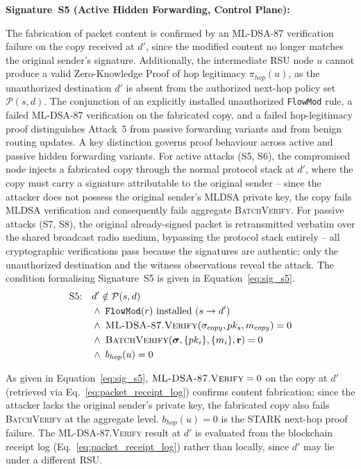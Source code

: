 \documentclass[12pt, a4paper]{report}
\begin{document}
\textbf{Signature~S5 (Active Hidden Forwarding, Control Plane):}

The fabrication of packet content is confirmed by an ML-DSA-87 verification
failure on the copy received at $d'$, since the modified content no longer
matches the original sender's signature.
Additionally, the intermediate RSU node $u$ cannot produce a valid
Zero-Knowledge Proof of hop legitimacy $\pi_{hop}(u)$, as the unauthorized
destination $d'$ is absent from the authorized next-hop policy set
$\mathcal{P}(s,d)$.
The conjunction of an explicitly installed unauthorized \texttt{FlowMod}
rule, a failed ML-DSA-87 verification on the fabricated copy, and a failed
hop-legitimacy proof distinguishes Attack~5 from passive forwarding variants and from benign routing updates. A key distinction governs proof behaviour across active
and passive hidden forwarding variants. For active attacks
(S5, S6), the compromised node injects a fabricated copy
through the normal protocol stack at $d'$, where the
copy must carry a signature attributable to the original
sender -- since the attacker does not possess the
original sender's \ac{MLDSA} private key, the copy
fails \ac{MLDSA} verification and consequently fails
aggregate \textsc{BatchVerify}. For passive attacks
(S7, S8), the original already-signed packet is
retransmitted verbatim over the shared broadcast radio
medium, bypassing the protocol stack entirely -- all
cryptographic verifications pass because the
signatures are authentic; only the unauthorized
destination and the witness observations reveal the
attack.
The condition formalising Signature~S5 is given in
Equation~\eqref{eq:sig_s5}.
\begin{equation}
\begin{aligned}
\text{S5:}\quad
  & d' \notin \mathcal{P}(s,d) \\
  & \wedge\; \texttt{FlowMod}(r)
    \text{ installed } (s \to d') \\
  & \wedge\; \textsc{ML-DSA-87.Verify}(
    \sigma_{copy}, pk_s, m_{copy}) = 0 \\
  & \wedge\; \textsc{BatchVerify}(
    \boldsymbol{\sigma},\{pk_i\},\{m_i\},
    \mathbf{r}) = 0 \\
  & \wedge\; b_{hop}(u) = 0
\end{aligned}
\label{eq:sig_s5}
\end{equation}

As given in Equation~\eqref{eq:sig_s5},
$\textsc{ML-DSA-87.Verify}=0$ on the copy at $d'$
(retrieved via Eq.~\ref{eq:packet_receipt_log})
confirms content fabrication; since the attacker lacks
the original sender's private key, the fabricated copy
also fails \textsc{BatchVerify} at the aggregate level.
$b_{hop}(u) = 0$ is the \ac{STARK} next-hop proof
failure. The \textsc{ML-DSA-87.Verify} result at $d'$
is evaluated from the blockchain receipt log
(Eq.~\ref{eq:packet_receipt_log}) rather than locally,
since $d'$ may lie under a different \ac{RSU}.
\end{document}
